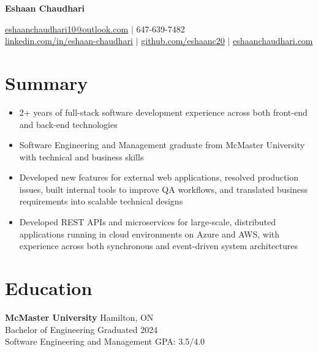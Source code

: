 \documentclass[a4paper,10pt]{article}
\begin{document}
\begin{center}
    {\huge \textbf{Eshaan Chaudhari}}

    \vspace{0.3em}

    \raisebox{-0.05em}{\faEnvelope}\hspace{0.5em}\href{mailto:eshaanchaudhari10@outlook.com}{eshaanchaudhari10@outlook.com} \quad
    $\vert$ \quad
    \raisebox{0.01em}{\faPhone}\hspace{0.5em}647-639-7482 \\[0.25em]

    \raisebox{0.01em}{\faLinkedin}\hspace{0.5em}\href{https://linkedin.com/in/eshaan-chaudhari}{linkedin.com/in/eshaan-chaudhari} \quad
    $\vert$ \quad
    \raisebox{0em}{\faGithub}\hspace{0.5em}\href{https://github.com/eshaanc20}{github.com/eshaanc20} \quad
    $\vert$ \quad
    \raisebox{0em}{\faGlobe}\hspace{0.5em}\href{https://eshaanchaudhari.com}{eshaanchaudhari.com}
\end{center}

\vspace{0.3em}

\section*{Summary}
\begin{itemize}
    \item 2+ years of full-stack software development experience across both front-end and back-end technologies
    \item Software Engineering and Management graduate from McMaster University with technical and business skills
    \item Developed new features for external web applications, resolved production issues, built internal tools to improve QA workflows, and translated business requirements into scalable technical designs
    \item Developed REST APIs and microservices for large-scale, distributed applications running in cloud environments on Azure and AWS, with experience across both synchronous and event-driven system architectures
\end{itemize}

\vspace{0.2em}

\section*{Education}
\textbf{McMaster University} \hfill Hamilton, ON \\
Bachelor of Engineering \hfill Graduated 2024 \\
Software Engineering and Management \hfill GPA: 3.5/4.0
\end{document}
